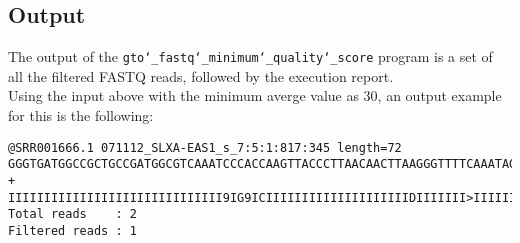 \subsection*{Output}
The output of the \texttt{gto\char`_fastq\char`_minimum\char`_quality\char`_score} program is a set of all the filtered FASTQ reads, followed by the execution report.\\
Using the input above with the minimum averge value as 30, an output example for this is the following:
\begin{lstlisting}
@SRR001666.1 071112_SLXA-EAS1_s_7:5:1:817:345 length=72
GGGTGATGGCCGCTGCCGATGGCGTCAAATCCCACCAAGTTACCCTTAACAACTTAAGGGTTTTCAAATAGA
+
IIIIIIIIIIIIIIIIIIIIIIIIIIIIII9IG9ICIIIIIIIIIIIIIIIIIIIIDIIIIIII>IIIIII/
Total reads    : 2
Filtered reads : 1
\end{lstlisting}
